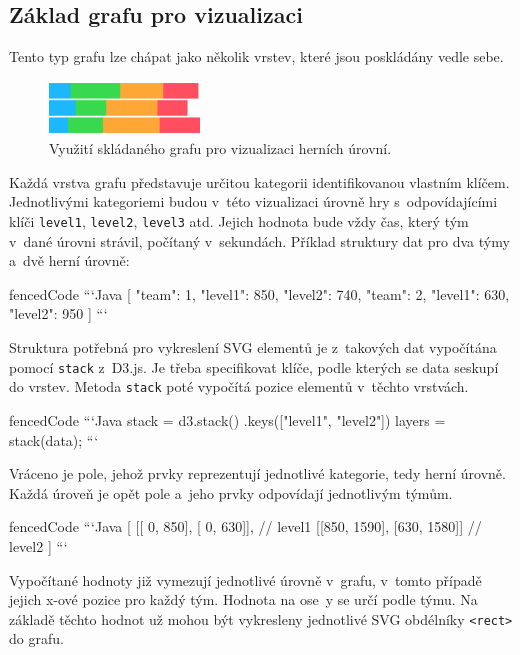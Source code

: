 \documentclass[
  digital, %
  oneside, %
  table,   %
  nolof,     %
  nolot,     %
]{fithesis3}
\begin{document}
\subsection{Základ grafu pro vizualizaci} \label{chartBase}
Tento typ grafu lze chápat jako několik vrstev, které jsou poskládány vedle sebe.
\begin{figure}[H]
  \begin{center}
    \includegraphics[width=4cm]{images/stack-ctf.pdf}
  \end{center}
  \caption{Využití skládaného grafu pro vizualizaci herních úrovní.}
  \label{fig:visualizationChart}
\end{figure}
Každá vrstva grafu představuje určitou kategorii identifikovanou vlastním klíčem. Jednotlivými kategoriemi budou v~této vizualizaci úrovně hry s~odpovídajícími klíči \verb|level1|, \verb|level2|, \verb|level3| atd. Jejich hodnota bude vždy čas, který tým v~dané úrovni strávil, počítaný v~sekundách. Příklad struktury dat pro dva týmy a~dvě herní úrovně:
\begin{markdown*}{
  fencedCode
}
```Java
[
  {"team": 1, "level1": 850, "level2": 740},
  {"team": 2, "level1": 630, "level2": 950}
]
```
\end{markdown*}

Struktura potřebná pro vykreslení SVG elementů je z~takových dat vypočítána pomocí \verb|stack| z~D3.js. Je třeba specifikovat klíče, podle kterých se data seskupí do vrstev. Metoda \verb|stack| poté vypočítá pozice elementů v~těchto vrstvách.

\begin{markdown*}{
  fencedCode
}
```Java
stack = d3.stack()
		  .keys(["level1", "level2"])
layers = stack(data);
```
\end{markdown*}
Vráceno je pole, jehož prvky reprezentují jednotlivé kategorie, tedy herní úrovně. Každá úroveň je opět pole a~jeho prvky odpovídají jednotlivým týmům.
\begin{markdown*}{
  fencedCode
}
```Java
[
  [[  0, 850], [  0, 630]],     // level1
  [[850, 1590], [630, 1580]]    // level2
]
```
\end{markdown*}
Vypočítané hodnoty již vymezují jednotlivé úrovně v~grafu, v~tomto případě jejich \mbox{x-ové} pozice pro každý tým. Hodnota na ose~y se určí podle týmu. Na základě těchto hodnot už mohou být vykresleny jednotlivé SVG obdélníky \verb|<rect>| do grafu.
\end{document}
